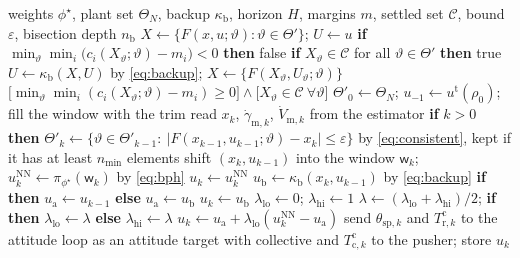 \documentclass[final,5p,times,twocolumn]{elsarticle}
\begin{document}
\begin{algorithm}[t]\caption{HOT with the lift-safety module, online loop}\label{alg:online}\begin{algorithmic}[1]
\Require weights $\phi^\star$, plant set $\Theta_N$, backup $\kappa_{\mathrm b}$, horizon $H$, margins $m$, settled set $\mathcal C$, bound $\varepsilon$, bisection depth $n_{\mathrm b}$
  \State $X\leftarrow\{F(x,u;\vartheta):\vartheta\in\Theta'\}$; $U\leftarrow u$
    \State \textbf{if} $\min_{\vartheta}\min_i\big(c_i(X_\vartheta;\vartheta)-m_i\big)<0$ \textbf{then} \Return false
    \State \textbf{if} $X_\vartheta\in\mathcal C$ for all $\vartheta\in\Theta'$ \textbf{then} \Return true
    \State $U\leftarrow\kappa_{\mathrm b}(X,U)$ by \eqref{eq:backup}; $X\leftarrow\{F(X_\vartheta,U_\vartheta;\vartheta)\}$
  \EndFor
  \State \Return $\big[\min_{\vartheta}\min_i(c_i(X_\vartheta;\vartheta)-m_i)\ge0\big]\wedge\big[X_\vartheta\in\mathcal C\ \forall\vartheta\big]$
\EndFunction
\State $\Theta'_0\leftarrow\Theta_N$; $u_{-1}\leftarrow u^{\mathrm t}(\rho_0)$; fill the window with the trim
  \State read $x_k$, $\dot\gamma_{\mathrm m,k}$, $\dot V_{\mathrm m,k}$ from the estimator
  \State \textbf{if} $k>0$ \textbf{then} $\Theta'_k\leftarrow\{\vartheta\in\Theta'_{k-1}:\ |F(x_{k-1},u_{k-1};\vartheta)-x_k|\le\varepsilon\}$ by \eqref{eq:consistent}, kept if it has at least $n_{\min}$ elements
  \State shift $(x_k,u_{k-1})$ into the window $\mathsf w_k$; $u^{\mathrm{NN}}_k\leftarrow\pi_{\phi^\star}(\mathsf w_k)$ by \eqref{eq:bph}
    \State $u_k\leftarrow u^{\mathrm{NN}}_k$
  \Else
    \State $u_{\mathrm b}\leftarrow\kappa_{\mathrm b}(x_k,u_{k-1})$ by \eqref{eq:backup}
    \State \textbf{if}  \textbf{then} $u_{\mathrm a}\leftarrow u_{k-1}$ \textbf{else} $u_{\mathrm a}\leftarrow u_{\mathrm b}$
      \State $u_k\leftarrow u_{\mathrm b}$
    \Else
      \State $\lambda_{\mathrm{lo}}\leftarrow0$; $\lambda_{\mathrm{hi}}\leftarrow1$
        \State $\lambda\leftarrow(\lambda_{\mathrm{lo}}+\lambda_{\mathrm{hi}})/2$; \textbf{if}  \textbf{then} $\lambda_{\mathrm{lo}}\leftarrow\lambda$ \textbf{else} $\lambda_{\mathrm{hi}}\leftarrow\lambda$
      \EndFor
      \State $u_k\leftarrow u_{\mathrm a}+\lambda_{\mathrm{lo}}(u^{\mathrm{NN}}_k-u_{\mathrm a})$
    \EndIf
  \EndIf
  \State send $\theta_{\mathrm{sp},k}$ and $T^{\mathrm c}_{\mathrm r,k}$ to the attitude loop as an attitude target with collective and $T^{\mathrm c}_{\mathrm c,k}$ to the pusher; store $u_k$
\EndFor
\end{algorithmic}\end{algorithm}
\end{document}
